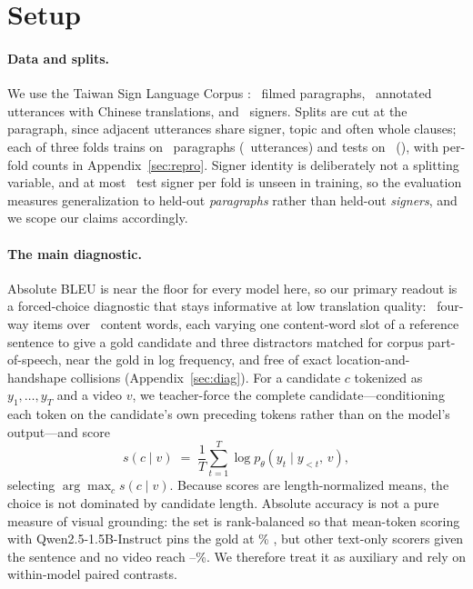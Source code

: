\documentclass[11pt]{article}
\begin{document}


\section{Setup}
\label{sec:setup}

\paragraph{Data and splits.}
We use the Taiwan Sign Language Corpus \citep{tslcorpus}: \SplitParagraphs\
filmed paragraphs, \SplitUtterances\ annotated utterances with Chinese
translations, and \SplitSigners\ signers. Splits are cut at the paragraph, since
adjacent utterances share signer, topic and often whole clauses; each of three
folds trains on \SplitTrainParas\ paragraphs (\SplitTrainUtts\ utterances) and
tests on \SplitTestParas\ (\SplitTestUtts), with per-fold counts in
Appendix~\ref{sec:repro}. Signer identity is deliberately not a splitting
variable, and at most \SplitTestSignersUnseen\ test signer per fold is unseen in
training, so the evaluation measures generalization to held-out \emph{paragraphs}
rather than held-out \emph{signers}, and we scope our claims accordingly.

\paragraph{The main diagnostic.}
Absolute BLEU is near the floor for every model here, so our primary readout is a
forced-choice diagnostic that stays informative at low translation quality:
\LexItemsN\ four-way items over \LexTypeN\ content words, each varying one
content-word slot of a reference sentence to give a gold candidate and three
distractors matched for corpus part-of-speech, near the gold in log frequency,
and free of exact location-and-handshape collisions
(Appendix~\ref{sec:diag}). For a candidate $c$ tokenized as $y_1,\dots,y_{T}$ and
a video $v$, we teacher-force the complete candidate---conditioning each token on
the candidate's own preceding tokens rather than on the model's output---and
score
\begin{equation}
s(c \mid v) \;=\; \frac{1}{T}\sum_{t=1}^{T} \log p_\theta\!\left(y_t \mid y_{<t},\, v\right),
\label{eq:score}
\end{equation}
selecting $\arg\max_c s(c\mid v)$. Because scores are length-normalized means,
the choice is not dominated by candidate length. Absolute accuracy is not a pure
measure of visual grounding: the set is rank-balanced so that mean-token scoring
with Qwen2.5-1.5B-Instruct pins the gold at \ChanceLevel\% \citep{qwen25}, but
other text-only scorers given the sentence and no video reach
\LexMajority--\LexLMpriorSum\%. We therefore treat it as auxiliary and rely on
within-model paired contrasts.
\end{document}
